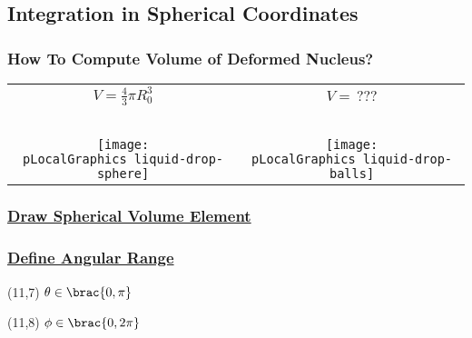 \subsection{Integration in Spherical Coordinates}
\begin{frame}\frametitle{How To Compute Volume of Deformed Nucleus?}
\begin{table}[htp]
\begin{center}
\begin{tabular}{cc}
	$V = \tfrac{4}{3}\pi R_{0}^{3}$ & $V = \,???$ \\
	\ \\
	\texttt{[image: \\pLocalGraphics liquid-drop-sphere]} & 
	\texttt{[image: \\pLocalGraphics liquid-drop-balls]} 
\end{tabular}
\end{center}
\end{table}
\end{frame}

\begin{frame}\frametitle{\href{https://tex.stackexchange.com/questions/159445/draw-in-cylindrical-and-spherical-coordinates/159452}{Draw Spherical Volume Element}}
	\footnotesize{
	}
\end{frame}

\begin{frame}\frametitle{\href{https://tex.stackexchange.com/questions/159445/draw-in-cylindrical-and-spherical-coordinates/159452}{Define Angular Range}}
	\footnotesize{
	
	\begin{textblock}{4}(11,7)
		$\theta \in \brac{0, \pi}$ 
	\end{textblock}
	\begin{textblock}{4}(11,8)
		$\phi  \in \brac{0, 2\pi}$ 
	\end{textblock}}
\end{frame}

